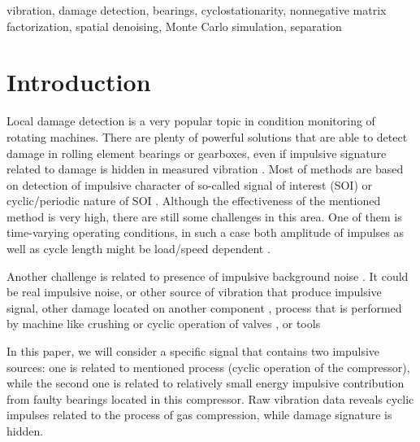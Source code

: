 \documentclass[3p, 12pt]{elsarticle} %
\begin{document}
\begin{frontmatter}
\begin{keyword}
vibration, damage detection, bearings, cyclostationarity, nonnegative matrix factorization, spatial denoising, Monte Carlo simulation, separation
\end{keyword}

\end{frontmatter}

\linenumbers

\section{Introduction}
Local damage detection is a very popular topic in condition monitoring of rotating machines. There are plenty of powerful solutions that are able to detect damage in rolling element bearings or gearboxes, even if impulsive signature related to damage is hidden in measured vibration \cite{samuel2005review,randall2011rolling}. Most of methods are based on detection of impulsive character of so-called signal of interest (SOI) \cite{antoni2006spectral,wodecki2018optimal} or cyclic/periodic nature of SOI \cite{cioch2013finding}. Although the effectiveness of the mentioned method is very high, there are still some challenges in this area. One of them is time-varying operating conditions, in such a case both amplitude of impulses as well as cycle length might be load/speed dependent \cite{gryllias2018application}.

Another challenge is related to presence of impulsive background noise \cite{wylomanska2017application,wylomanska2016impulsive,zak2014application, antoni2016infogram,puchalski2017stable,yu2013new}. It could be real impulsive noise, or other source of vibration that produce impulsive signal, other damage located on another component \cite{kruczek2017cyclic}, process that is performed by machine like crushing \cite{wylomanska2016impulsive} or cyclic operation of valves \cite{antoni2002effective,barszcz2013bearings}, or tools \cite{cocconcelli2012algorithm}

In this paper, we will consider a specific signal that contains two impulsive sources: one is related to mentioned process (cyclic operation of the compressor), while the second one is related to relatively small energy impulsive contribution from faulty bearings located in this compressor. Raw vibration data reveals cyclic impulses related to the process of gas compression, while damage signature is hidden. 
\end{document}

